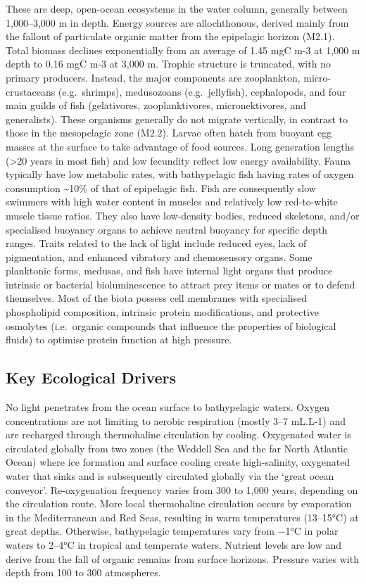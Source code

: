 \documentclass[
  letterpaper,
  DIV=11,
  numbers=noendperiod]{scrartcl}
\begin{document}
These are deep, open-ocean ecosystems in the water column, generally
between 1,000--3,000 m in depth. Energy sources are allochthonous,
derived mainly from the fallout of particulate organic matter from the
epipelagic horizon (M2.1). Total biomass declines exponentially from an
average of 1.45 mgC m-3 at 1,000 m depth to 0.16 mgC m-3 at 3,000 m.
Trophic structure is truncated, with no primary producers. Instead, the
major components are zooplankton, micro-crustaceans (e.g.~shrimps),
medusozoans (e.g.~jellyfish), cephalopods, and four main guilds of fish
(gelativores, zooplanktivores, micronektivores, and generalists). These
organisms generally do not migrate vertically, in contrast to those in
the mesopelagic zone (M2.2). Larvae often hatch from buoyant egg masses
at the surface to take advantage of food sources. Long generation
lengths (\textgreater20 years in most fish) and low fecundity reflect
low energy availability. Fauna typically have low metabolic rates, with
bathypelagic fish having rates of oxygen consumption \textasciitilde10\%
of that of epipelagic fish. Fish are consequently slow swimmers with
high water content in muscles and relatively low red-to-white muscle
tissue ratios. They also have low-density bodies, reduced skeletons,
and/or specialised buoyancy organs to achieve neutral buoyancy for
specific depth ranges. Traits related to the lack of light include
reduced eyes, lack of pigmentation, and enhanced vibratory and
chemosensory organs. Some planktonic forms, medusas, and fish have
internal light organs that produce intrinsic or bacterial
bioluminescence to attract prey items or mates or to defend themselves.
Most of the biota possess cell membranes with specialised phospholipid
composition, intrinsic protein modifications, and protective osmolytes
(i.e.~organic compounds that influence the properties of biological
fluids) to optimise protein function at high pressure.

\subsection{Key Ecological Drivers}\label{key-ecological-drivers-37}

No light penetrates from the ocean surface to bathypelagic waters.
Oxygen concentrations are not limiting to aerobic respiration (mostly
3--7 mL.L-1) and are recharged through thermohaline circulation by
cooling. Oxygenated water is circulated globally from two zones (the
Weddell Sea and the far North Atlantic Ocean) where ice formation and
surface cooling create high-salinity, oxygenated water that sinks and is
subsequently circulated globally via the `great ocean conveyor'.
Re-oxygenation frequency varies from 300 to 1,000 years, depending on
the circulation route. More local thermohaline circulation occurs by
evaporation in the Mediterranean and Red Seas, resulting in warm
temperatures (13--15°C) at great depths. Otherwise, bathypelagic
temperatures vary from −1°C in polar waters to 2--4°C in tropical and
temperate waters. Nutrient levels are low and derive from the fall of
organic remains from surface horizons. Pressure varies with depth from
100 to 300 atmospheres.
\end{document}
